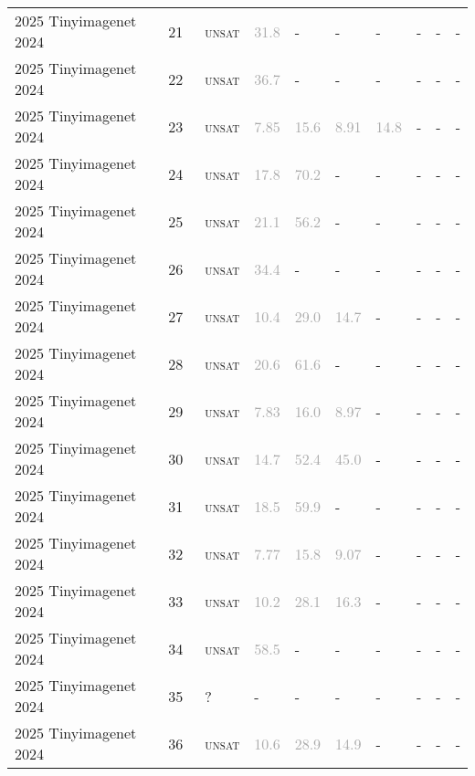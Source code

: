 \begin{center}
{\begin{longtable}{@{}llllllllll@{}}
2025 Tinyimagenet 2024 & 21 & ~\textsc{unsat} & \textcolor{darkgray}{31.8} & - & - & - & - & - & - \\
2025 Tinyimagenet 2024 & 22 & ~\textsc{unsat} & \textcolor{darkgray}{36.7} & - & - & - & - & - & - \\
2025 Tinyimagenet 2024 & 23 & ~\textsc{unsat} & \textcolor{darkgray}{7.85} & \textcolor{darkgray}{15.6} & \textcolor{darkgray}{8.91} & \textcolor{darkgray}{14.8} & - & - & - \\
2025 Tinyimagenet 2024 & 24 & ~\textsc{unsat} & \textcolor{darkgray}{17.8} & \textcolor{darkgray}{70.2} & - & - & - & - & - \\
2025 Tinyimagenet 2024 & 25 & ~\textsc{unsat} & \textcolor{darkgray}{21.1} & \textcolor{darkgray}{56.2} & - & - & - & - & - \\
2025 Tinyimagenet 2024 & 26 & ~\textsc{unsat} & \textcolor{darkgray}{34.4} & - & - & - & - & - & - \\
2025 Tinyimagenet 2024 & 27 & ~\textsc{unsat} & \textcolor{darkgray}{10.4} & \textcolor{darkgray}{29.0} & \textcolor{darkgray}{14.7} & - & - & - & - \\
2025 Tinyimagenet 2024 & 28 & ~\textsc{unsat} & \textcolor{darkgray}{20.6} & \textcolor{darkgray}{61.6} & - & - & - & - & - \\
2025 Tinyimagenet 2024 & 29 & ~\textsc{unsat} & \textcolor{darkgray}{7.83} & \textcolor{darkgray}{16.0} & \textcolor{darkgray}{8.97} & - & - & - & - \\
2025 Tinyimagenet 2024 & 30 & ~\textsc{unsat} & \textcolor{darkgray}{14.7} & \textcolor{darkgray}{52.4} & \textcolor{darkgray}{45.0} & - & - & - & - \\
2025 Tinyimagenet 2024 & 31 & ~\textsc{unsat} & \textcolor{darkgray}{18.5} & \textcolor{darkgray}{59.9} & - & - & - & - & - \\
2025 Tinyimagenet 2024 & 32 & ~\textsc{unsat} & \textcolor{darkgray}{7.77} & \textcolor{darkgray}{15.8} & \textcolor{darkgray}{9.07} & - & - & - & - \\
2025 Tinyimagenet 2024 & 33 & ~\textsc{unsat} & \textcolor{darkgray}{10.2} & \textcolor{darkgray}{28.1} & \textcolor{darkgray}{16.3} & - & - & - & - \\
2025 Tinyimagenet 2024 & 34 & ~\textsc{unsat} & \textcolor{darkgray}{58.5} & - & - & - & - & - & - \\
2025 Tinyimagenet 2024 & 35 & ~? & - & - & - & - & - & - & - \\
2025 Tinyimagenet 2024 & 36 & ~\textsc{unsat} & \textcolor{darkgray}{10.6} & \textcolor{darkgray}{28.9} & \textcolor{darkgray}{14.9} & - & - & - & - \\

\end{longtable}}
\end{center}

